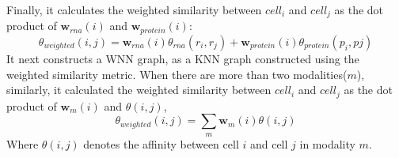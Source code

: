 Finally, it calculates the weighted similarity between $cell_i$ and $cell_j$ as the dot product of $\textbf{w}_{rna}(i)$ and $\textbf{w}_{protein}(i)$:
\begin{equation}
	\theta_{weighted}(i,j)=\textbf{w}_{rna}(i)\theta_{rna}(r_i,r_j) + \textbf{w}_{protein}(i)\theta_{protein}(p_i,pj)
\end{equation}
It next constructs a WNN graph, as a KNN graph constructed using the weighted similarity metric. When there are more than two modalities($m$), similarly, it calculated the weighted similarity between $cell_i$ and $cell_j$ as the dot product of $\textbf{w}_m(i)$ and $\theta(i,j)$,
\begin{equation}
	\theta_{weighted}(i,j)=\sum_{m} \textbf{w}_m(i)\theta(i,j)
\end{equation}
Where $\theta(i,j)$ denotes the affinity between cell $i$ and cell $j$ in modality $m$.

